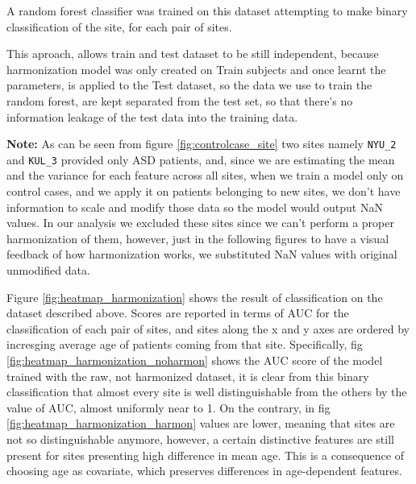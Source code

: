 \documentclass[11pt]{report}
\begin{document}
A random forest classifier was trained on this dataset attempting to make binary classification of the site, for each pair of sites.

This aproach, allows train and test dataset to be still independent, because harmonization model was only created on Train subjects and once learnt the parameters, is applied to the Test dataset, so the data we use to train the random forest, are kept separated from the test set, so that there's no information leakage of the test data into the training data.
\newline

\textbf{Note:} As can be seen from figure \ref{fig:controlcase_site} two sites namely \texttt{NYU\_2} and \texttt{KUL\_3} provided only ASD patients, and, since we are estimating the mean and the variance for each feature across all sites, when we train a model only on control cases, and we apply it on patients belonging to new sites, we don't have information to scale and modify those data so the model would output NaN values.
In our analysis we excluded these sites since we can't perform a proper harmonization of them, however, just in the following figures to have a visual feedback of how harmonization works, we substituted NaN values with original unmodified data.
\newline

Figure \ref{fig:heatmap_harmonization} shows the result of classification on the dataset described above. Scores are reported in terms of AUC for the classification of each pair of sites, and sites along the x and y axes are ordered by incresging average age of patients coming from that site.
Specifically, fig \ref{fig:heatmap_harmonization_noharmon} shows the AUC score of the model trained with the raw, not harmonized dataset, it is clear from this binary classification that almost every site is well distinguishable from the others by the value of AUC, almost uniformly near to 1.
On the contrary, in fig \ref{fig:heatmap_harmonization_harmon} values are lower, meaning that sites are not so distinguishable anymore, however, a certain distinctive features are still present for sites presenting high difference in mean age.
This is a consequence of choosing age as covariate, which preserves differences in age-dependent features.
\end{document}
